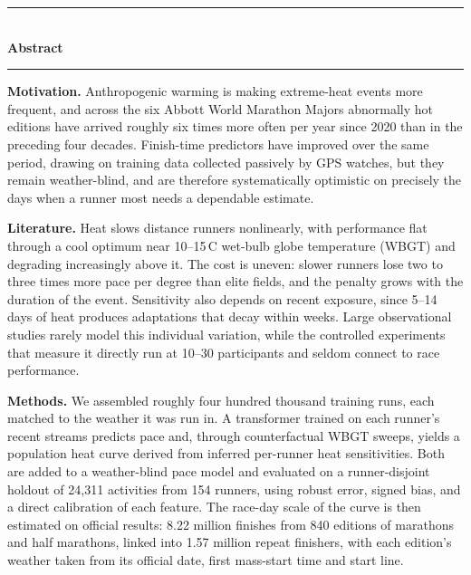 \documentclass[11pt]{article}
\renewcommand{\_}{\textunderscore\allowbreak}
\begin{document}
\begin{center}
\rule{\linewidth}{0.4pt}\\[3pt]
{\large\textbf{Abstract}}\\[1pt]
\rule{\linewidth}{0.4pt}
\end{center}

\begin{singlespace}\small

\noindent\textbf{Motivation.} Anthropogenic warming is making extreme-heat events more frequent, and across the six Abbott World Marathon Majors abnormally hot editions have arrived roughly six times more often per year since 2020 than in the preceding four decades. Finish-time predictors have improved over the same period, drawing on training data collected passively by GPS watches, but they remain weather-blind, and are therefore systematically optimistic on precisely the days when a runner most needs a dependable estimate.

\smallskip
\noindent\textbf{Literature.} Heat slows distance runners nonlinearly, with performance flat through a cool optimum near 10--15\,\textdegree C wet-bulb globe temperature (WBGT) and degrading increasingly above it. The cost is uneven: slower runners lose two to three times more pace per degree than elite fields, and the penalty grows with the duration of the event. Sensitivity also depends on recent exposure, since 5--14 days of heat produces adaptations that decay within weeks. Large observational studies rarely model this individual variation, while the controlled experiments that measure it directly run at 10--30 participants and seldom connect to race performance.

\smallskip
\noindent\textbf{Methods.} We assembled roughly four hundred thousand training runs, each matched to the weather it was run in. A transformer trained on each runner's recent streams predicts pace and, through counterfactual WBGT sweeps, yields a population heat curve derived from inferred per-runner heat sensitivities. Both are added to a weather-blind pace model and evaluated on a runner-disjoint holdout of 24{,}311 activities from 154 runners, using robust error, signed bias, and a direct calibration of each feature. The race-day scale of the curve is then estimated on official results: 8.22 million finishes from 840 editions of marathons and half marathons, linked into 1.57 million repeat finishers, with each edition's weather taken from its official date, first mass-start time and start line.


\end{singlespace}
\end{document}

